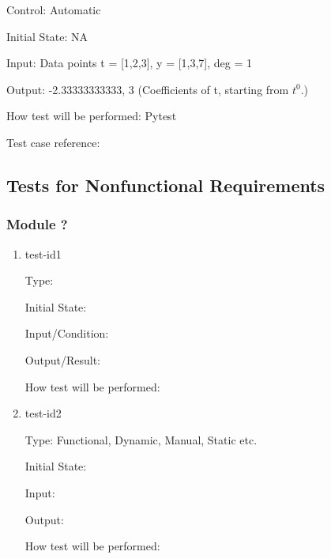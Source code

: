 \documentclass[12pt, titlepage]{article}
\begin{document}
Control: Automatic

Initial State: NA

Input: Data points t = [1,2,3], y = [1,3,7], deg = 1

Output: -2.33333333333, 3 (Coefficients of t, starting from $t^{0}$.)

How test will be performed: Pytest

Test case reference: ~\cite{RegNormal}\\



\subsection{Tests for Nonfunctional Requirements}



\subsubsection{Module ?}
		
\begin{enumerate}

\item{test-id1\\}

Type: 
					
Initial State: 
					
Input/Condition: 
					
Output/Result: 
					
How test will be performed: 
					
\item{test-id2\\}

Type: Functional, Dynamic, Manual, Static etc.
					
Initial State: 
					
Input: 
					
Output: 
					
How test will be performed: 

\end{enumerate}
\end{document}
